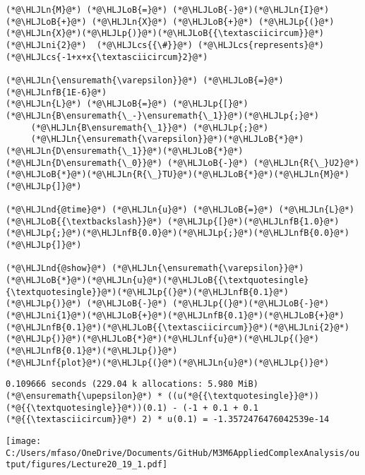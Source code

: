 \documentclass[12pt,landscape]{article}
\newcommand{\HLJLn}[1]{#1}
\newcommand{\HLJLnd}[1]{\textcolor[RGB]{214,102,97}{#1}}
\newcommand{\HLJLnf}[1]{\textcolor[RGB]{66,102,213}{#1}}
\newcommand{\HLJLnfB}[1]{\textcolor[RGB]{59,151,46}{#1}}
\newcommand{\HLJLni}[1]{\textcolor[RGB]{59,151,46}{#1}}
\newcommand{\HLJLoB}[1]{\textcolor[RGB]{102,102,102}{\textbf{#1}}}
\newcommand{\HLJLp}[1]{#1}
\newcommand{\HLJLcs}[1]{\textcolor[RGB]{153,153,119}{\textit{#1}}}
\def\upepsilon{\varepsilon}
\def\cent#1{\begin{center}#1\end{center} }
\begin{document}
{\begin{lstlisting}
(*@\HLJLn{M}@*) (*@\HLJLoB{=}@*) (*@\HLJLoB{-}@*)(*@\HLJLn{I}@*) (*@\HLJLoB{+}@*) (*@\HLJLn{X}@*) (*@\HLJLoB{+}@*) (*@\HLJLp{(}@*)(*@\HLJLn{X}@*)(*@\HLJLp{)}@*)(*@\HLJLoB{{\textasciicircum}}@*)(*@\HLJLni{2}@*)  (*@\HLJLcs{{\#}}@*) (*@\HLJLcs{represents}@*) (*@\HLJLcs{-1+x+x{\textasciicircum}2}@*)

(*@\HLJLn{\ensuremath{\varepsilon}}@*) (*@\HLJLoB{=}@*) (*@\HLJLnfB{1E-6}@*)
(*@\HLJLn{L}@*) (*@\HLJLoB{=}@*) (*@\HLJLp{[}@*)(*@\HLJLn{B\ensuremath{\_-}\ensuremath{\_1}}@*)(*@\HLJLp{;}@*)
     (*@\HLJLn{B\ensuremath{\_1}}@*) (*@\HLJLp{;}@*)
     (*@\HLJLn{\ensuremath{\varepsilon}}@*)(*@\HLJLoB{*}@*)(*@\HLJLn{D\ensuremath{\_1}}@*)(*@\HLJLoB{*}@*)(*@\HLJLn{D\ensuremath{\_0}}@*) (*@\HLJLoB{-}@*) (*@\HLJLn{R{\_}U2}@*)(*@\HLJLoB{*}@*)(*@\HLJLn{R{\_}TU}@*)(*@\HLJLoB{*}@*)(*@\HLJLn{M}@*)(*@\HLJLp{]}@*)

(*@\HLJLnd{@time}@*) (*@\HLJLn{u}@*) (*@\HLJLoB{=}@*) (*@\HLJLn{L}@*) (*@\HLJLoB{{\textbackslash}}@*) (*@\HLJLp{[}@*)(*@\HLJLnfB{1.0}@*)(*@\HLJLp{;}@*)(*@\HLJLnfB{0.0}@*)(*@\HLJLp{;}@*)(*@\HLJLnfB{0.0}@*)(*@\HLJLp{]}@*)

(*@\HLJLnd{@show}@*) (*@\HLJLn{\ensuremath{\varepsilon}}@*)(*@\HLJLoB{*}@*)(*@\HLJLn{u}@*)(*@\HLJLoB{{\textquotesingle}{\textquotesingle}}@*)(*@\HLJLp{(}@*)(*@\HLJLnfB{0.1}@*)(*@\HLJLp{)}@*) (*@\HLJLoB{-}@*) (*@\HLJLp{(}@*)(*@\HLJLoB{-}@*)(*@\HLJLni{1}@*)(*@\HLJLoB{+}@*)(*@\HLJLnfB{0.1}@*)(*@\HLJLoB{+}@*)(*@\HLJLnfB{0.1}@*)(*@\HLJLoB{{\textasciicircum}}@*)(*@\HLJLni{2}@*)(*@\HLJLp{)}@*)(*@\HLJLoB{*}@*)(*@\HLJLnf{u}@*)(*@\HLJLp{(}@*)(*@\HLJLnfB{0.1}@*)(*@\HLJLp{)}@*)
(*@\HLJLnf{plot}@*)(*@\HLJLp{(}@*)(*@\HLJLn{u}@*)(*@\HLJLp{)}@*)
\end{lstlisting}

\begin{lstlisting}
0.109666 seconds (229.04 k allocations: 5.980 MiB)
(*@\ensuremath{\upepsilon}@*) * ((u(*@{{\textquotesingle}}@*))(*@{{\textquotesingle}}@*))(0.1) - (-1 + 0.1 + 0.1 (*@{{\textasciicircum}}@*) 2) * u(0.1) = -1.3572476476042539e-14
\end{lstlisting}


\cent{\texttt{[image: C:/Users/mfaso/OneDrive/Documents/GitHub/M3M6AppliedComplexAnalysis/output/figures/Lecture20\_19\_1.pdf]}}

}
\end{document}
